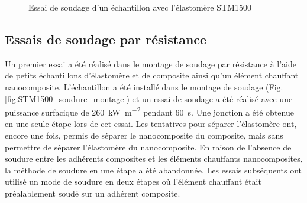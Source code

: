 \begin{figure}[h]
	\centering
	 \qquad
	\caption{Essai de soudage d'un échantillon avec l'élastomère STM1500}
	\label{fig:STM1500_soudure}
\end{figure}

\subsection{Essais de soudage par résistance}

Un premier essai a été réalisé dans le montage de soudage par résistance à l'aide de petits échantillons d'élastomère et de composite ainsi qu'un élément chauffant nanocomposite. 
L'échantillon a été installé dans le montage de soudage (Fig. \ref{fig:STM1500_soudure_montage}) et un essai de soudage a été réalisé avec une puissance surfacique de \SI{260}{\kilo\watt\per\square\metre} pendant \SI{60}{\second}. 
Une jonction a été obtenue en une seule étape lors de cet essai. 
Les tentatives pour séparer l'élastomère ont, encore une fois, permis de séparer le nanocomposite du composite, mais sans permettre de séparer l'élastomère du nanocomposite. 
En raison de l'absence de soudure entre les adhérents composites et les éléments chauffants nanocomposites, la méthode de soudure en une étape a été abandonnée.
Les essais subséquents ont utilisé un mode de soudure en deux étapes où l'élément chauffant était préalablement soudé sur un adhérent composite. 

